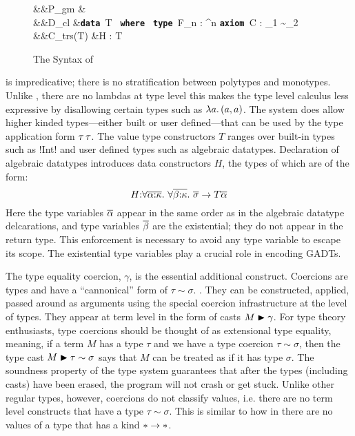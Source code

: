 \documentclass[manuscript,screen,nonacm]{acmart}
\begin{document}
\begin{figure}[ht]
  \begin{syntax}
     &&P_{gm} &\bnfeq {} \mathrel{;} \many{\Tm}\\
     &&D_{cl} &\bnfeq \textbf{\texttt{data }}\App T\co\many{\kappa} \to \star\App \textbf{\texttt{ where }}\App {} \bnfor \textbf{\texttt{type }}\App F_n : \many\kappa^n \to \kappa \bnfor  \textbf{\texttt{axiom }}\App C\App \many{\alpha\co\kappa} : \sigma_1 \sim \sigma_2 \\
     &&C_{trs}(T) &\bnfeq H : \Forall {\many{\alpha\co\kappa}} { \many{(\tau \sim \tau)} \then \many\sigma \to T\many\alpha}\\
  \end{syntax}
  
  \caption{The Syntax of \SFC}
  \label{fig:system-fc-syntax}
\end{figure}

\SFC is impredicative; there is no stratification between polytypes and monotypes. Unlike \SFw, there are no lambdas at type level this makes the type level calculus less expressive by disallowing certain types such as $\lambda a.\, (a, a)$. The system does allow higher kinded types---either built or user defined---that can be used by the type application form $\tau\,\tau$.  The value type constructors $T$ ranges over built-in types such as !Int! and user defined types such as algebraic datatypes. Declaration of algebraic datatypes introduces data constructors $H$, the types of which are of the form:
$$
H {:} \forall\overline{\alpha{:}\kappa}.~\forall\overline{\beta{:}\kappa}.~\overline{\sigma} \to T \overline{\alpha}
$$
Here the type variables $\overline{\alpha}$ appear in the same order as in the algebraic datatype delcarations,  and type variables $\overline{\beta}$ are the existential; they do not appear in the return type. This enforcement is necessary to avoid any type variable to escape its scope. The existential type variables play a crucial role in encoding GADTs. 

The type equality coercion, $\gamma$, is the essential additional construct. Coercions are types and have a ``cannonical'' form of $\tau\sim\sigma$. . They can be constructed, applied, passed around as arguments using the special coercion infrastructure at the level of types. They appear at term level in the form of casts $M\mathrel{\blacktriangleright}\gamma$. For type theory enthusiasts, type coercions should be thought of as extensional type equality, meaning, if a term $M$ has a type $\tau$ and we have a type coercion $\tau\sim\sigma$, then the type cast $M\mathrel{\blacktriangleright}\tau\sim\sigma$ says that $M$ can be treated as if it has type $\sigma$. The soundness property of the type system guarantees that after the types (including casts) have been erased, the program will not crash or get stuck. Unlike other regular types, however, coercions do not classify values, i.e. there are no term level constructs that have a type $\tau\sim\sigma$. This is similar to how in \SFw there are no values of a type that has a kind $\ast\to\ast$.
\end{document}
